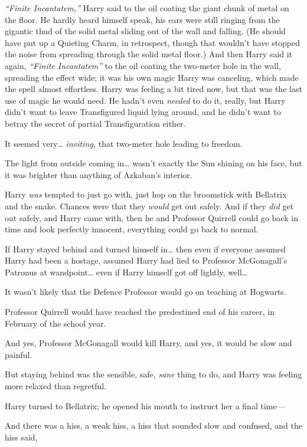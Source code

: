 \emph{``Finite Incantatem,''} Harry said to the oil coating the giant
chunk of metal on the floor. He hardly heard himself speak, his ears
were still ringing from the gigantic thud of the solid metal sliding out
of the wall and falling. (He should have put up a Quieting Charm, in
retrospect, though that wouldn't have stopped the noise from spreading
through the solid metal floor.) And then Harry said it again,
\emph{``Finite Incantatem''} to the oil coating the two-meter hole in
the wall, spreading the effect wide; it was his own magic Harry was
canceling, which made the spell almost effortless. Harry was feeling a
bit tired now, but that was the last use of magic he would need. He
hadn't even \emph{needed} to do it, really, but Harry didn't want to
leave Transfigured liquid lying around, and he didn't want to betray the
secret of partial Transfiguration either.

It seemed very\ldots{} \emph{inviting,} that two-meter hole leading to
freedom.

The light from outside coming in\ldots{} wasn't exactly the Sun shining
on his face, but it was brighter than anything of Azkaban's interior.

Harry \emph{was} tempted to just go with, just hop on the broomstick
with Bellatrix and the snake. Chances were that they \emph{would} get
out safely. And if they \emph{did} get out safely, and Harry came with,
then he and Professor Quirrell could go back in time and look perfectly
innocent, everything could go back to normal.

If Harry stayed behind and turned himself in\ldots{} then even if
everyone assumed Harry had been a hostage, assumed Harry had lied to
Professor McGonagall's Patronus at wandpoint\ldots{} even if Harry
himself got off lightly, well\ldots{}

It wasn't likely that the Defence Professor would go on teaching at
Hogwarts.

Professor Quirrell would have reached the predestined end of his career,
in February of the school year.

And yes, Professor McGonagall would kill Harry, and yes, it would be
slow and painful.

But staying behind was the sensible, safe, \emph{sane} thing to do, and
Harry was feeling more relaxed than regretful.

Harry turned to Bellatrix; he opened his mouth to instruct her a final
time---

And there was a hiss, a weak hiss, a hiss that sounded slow and
confused, and the hiss said,


